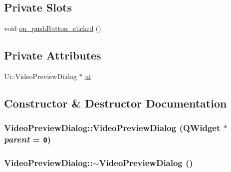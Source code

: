 \subsection*{Private Slots}
\begin{CompactItemize}
\item 
void \hyperlink{class_video_preview_dialog_b28df1893dadda505b0eeb287b51a71c}{on\_\-pushButton\_\-clicked} ()
\end{CompactItemize}
\subsection*{Private Attributes}
\begin{CompactItemize}
\item 
Ui::VideoPreviewDialog $\ast$ \hyperlink{class_video_preview_dialog_30b98e0a21017be6e6289d94b6504cfa}{ui}
\end{CompactItemize}


\subsection{Constructor \& Destructor Documentation}
\hypertarget{class_video_preview_dialog_c63fa85167ab97c5e2b8be1963b37f74}{
\subsubsection[{VideoPreviewDialog}]{\setlength{\rightskip}{0pt plus 5cm}VideoPreviewDialog::VideoPreviewDialog (QWidget $\ast$ {\em parent} = {\tt 0})}}
\label{class_video_preview_dialog_c63fa85167ab97c5e2b8be1963b37f74}


\hypertarget{class_video_preview_dialog_36bbfbd9fdea4eb51908052b177e5cf1}{
\subsubsection[{$\sim$VideoPreviewDialog}]{\setlength{\rightskip}{0pt plus 5cm}VideoPreviewDialog::$\sim$VideoPreviewDialog ()}}
\label{class_video_preview_dialog_36bbfbd9fdea4eb51908052b177e5cf1}




